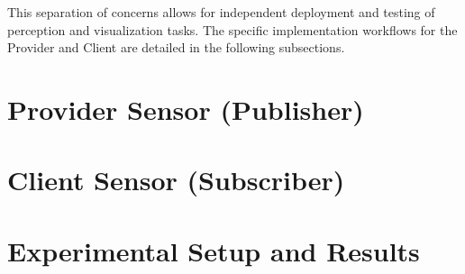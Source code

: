 This separation of concerns allows for independent deployment and testing of perception and visualization tasks. The specific implementation workflows for the Provider and Client are detailed in the following subsections.

\section{Provider Sensor (Publisher)}


\section{Client Sensor (Subscriber)}


\section{Experimental Setup and Results}
